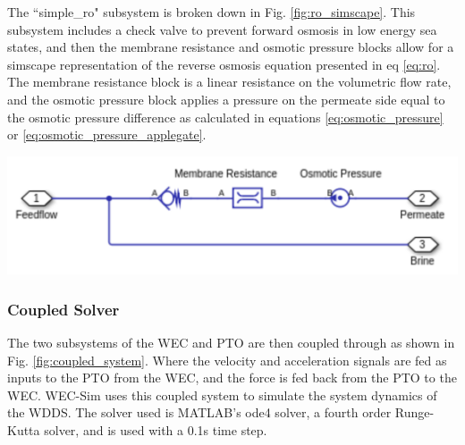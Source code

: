 \documentclass[twocolumn,10pt]{asme2e}
\begin{document}
The ``simple\_ro" subsystem is broken down in Fig. \ref{fig:ro_simscape}. This subsystem includes a check valve to prevent forward osmosis in low energy sea states, and then the membrane resistance and osmotic pressure blocks allow for a simscape representation of the reverse osmosis equation presented in eq \ref{eq:ro}. The membrane resistance block is a linear resistance on the volumetric flow rate, and the osmotic pressure block applies a pressure on the permeate side equal to the osmotic pressure difference as calculated in equations \ref{eq:osmotic_pressure} or \ref{eq:osmotic_pressure_applegate}.

\begin{center}
    \includegraphics[width=\linewidth]{../figs/desalsimscape.pdf}
    \label{fig:ro_simscape}
\end{center}

\subsubsection{Coupled Solver}

The two subsystems of the WEC and PTO are then coupled through as shown in Fig. \ref{fig:coupled_system}. Where the velocity and acceleration signals are fed as inputs to the PTO from the WEC, and the force is fed back from the PTO to the WEC. WEC-Sim uses this coupled system to simulate the system dynamics of the WDDS. The solver used is MATLAB's ode4 solver, a fourth order Runge-Kutta solver, and is used with a 0.1s time step. 
\end{document}
